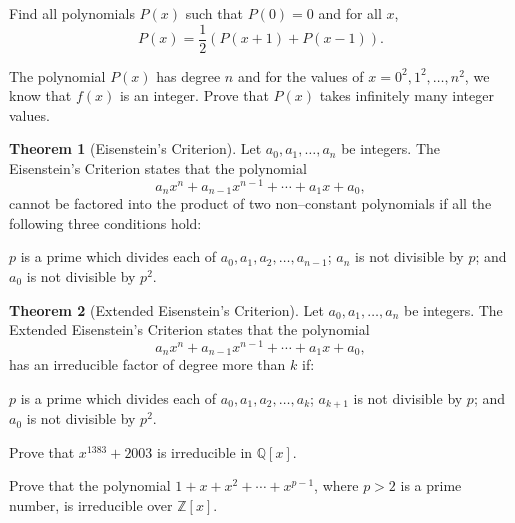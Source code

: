 \documentclass[12pt,a4paper]{memoir}
\theoremstyle{definition}
\newtheorem{theorem}{Theorem}
\begin{document}
\begin{question}[name={1975 USA}]
	Find all polynomials $P(x)$ such that $P(0)=0$ and for all $x$,
	\[P(x)=\frac{1}{2}\left(P(x+1)+P(x-1)\right).\]
\end{question}

\begin{question}
	The polynomial $P(x)$ has degree $n$ and for the values of $x=0^2,1^2,\dots,n^2$, we know that $f(x)$ is an integer. Prove that $P(x)$ takes infinitely many integer values.
\end{question}

\begin{tcolorbox}[title={Eisenstein's Criterion \& Extension}]
	\begin{theorem}[Eisenstein's Criterion]
		Let $a_0, a_1, \dots ,a_n$ be integers. The Eisenstein's Criterion states that the polynomial \[a_nx^n+a_{n-1}x^{n-1}+ \cdots + a_1x+a_0,\] cannot be factored into the product of two non--constant polynomials if all the following three conditions hold:
		\begin{tasks}
			\task $p$ is a prime which divides each of $a_0,a_1,a_2,\dots,a_{n-1}$;
			\task $a_n$ is not divisible by $p$; and
			\task $a_0$ is not divisible by $p^2$.
		\end{tasks}
	\end{theorem}
	
	\begin{theorem}[Extended Eisenstein's Criterion]
		Let $a_0, a_1, \dots ,a_n$ be integers. The Extended Eisenstein's Criterion states that the polynomial \[a_nx^n+a_{n-1}x^{n-1}+ \cdots + a_1x+a_0,\]
		has an irreducible factor of degree more than $k$ if:
		\begin{tasks}
			\task $p$ is a prime which divides each of $a_0,a_1,a_2,\dots,a_{k}$;
			\task $a_{k+1}$ is not divisible by $p$; and
			\task $a_0$ is not divisible by $p^2$.
		\end{tasks}
	\end{theorem}
\end{tcolorbox}


\begin{question}
	Prove that $x^{1383}+2003$ is irreducible in $\mathbb Q[x]$.
\end{question}

\begin{question}
	Prove that the polynomial $1+x+x^2+\cdots+x^{p-1}$, where $p>2$ is a prime number, is irreducible over $\mathbb Z[x]$.
\end{question}
\end{document}
